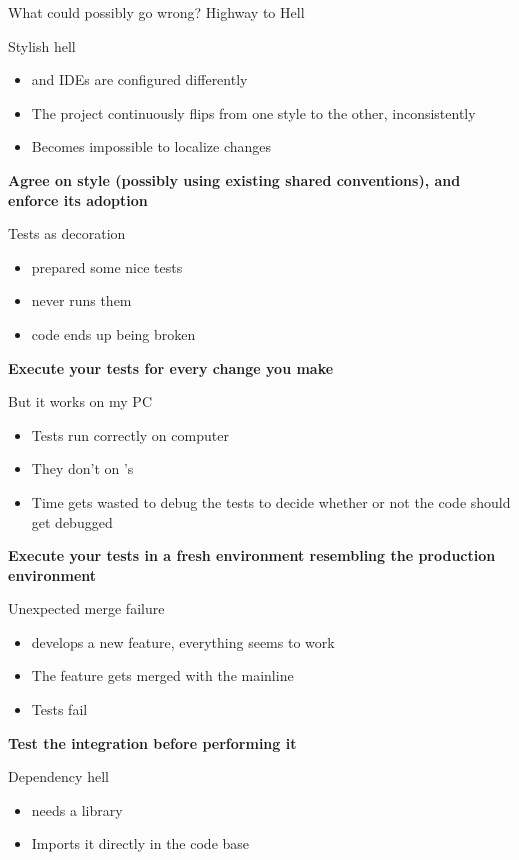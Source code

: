 \documentclass[presentation]{beamer}
\begin{document}
\begin{frame}{What could possibly go wrong? Highway to Hell }
\begin{block}{Stylish hell}
\begin{itemize}
\begin{itemize}
			\end{itemize}
			\item \baddev{} and \gooddev{} IDEs are configured differently
			\item The project continuously flips from one style to the other, inconsistently
			\item Becomes impossible to localize changes
		\end{itemize}
		\textbf{Agree on style (possibly using existing shared conventions), and enforce its adoption}
	\end{block}
	\begin{block}{Tests as decoration}
		\begin{itemize}
			\item \gooddev{} prepared some nice tests
			\item \baddev{} never runs them
			\item \baddev{} code ends up being broken
		\end{itemize}
		\textbf{Execute your tests for every change you make}
	\end{block}
	\begin{block}{But it works on my PC}
		\begin{itemize}
			\item Tests run correctly on \baddev{} computer
			\item They don't on \gooddev{}'s
			\item Time gets wasted to debug the tests to decide whether or not the code should get debugged
		\end{itemize}
		\textbf{Execute your tests in a fresh environment resembling the production environment}
	\end{block}
	\begin{block}{Unexpected merge failure}
		\begin{itemize}
			\item \baddev{} develops a new feature, everything seems to work
			\item The feature gets merged with the mainline
			\item Tests fail
		\end{itemize}
		\textbf{Test the integration before performing it}
	\end{block}
	\begin{block}{Dependency hell}
		\begin{itemize}
			\item \baddev{} needs a library
			\item Imports it directly in the code base

\end{itemize}
\end{block}
\end{frame}
\end{document}
